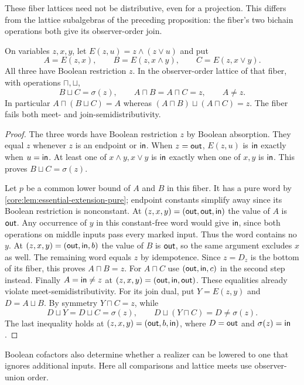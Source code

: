 These fiber lattices need not be distributive, even for a projection.
This differs from the lattice subalgebras of the preceding proposition:
the fiber's two bichain operations both give its observer-order join.

\begin{corollary}
\label{core:cor:boolean-fiber-nondistributive}
On variables $z,x,y$, let $E(z,u)=z\wedge(z\vee u)$ and put
\[
 A=E(z,x),\qquad B=E(z,x\wedge y),\qquad C=E(z,x\vee y).
\]
All three have Boolean restriction $z$. In the observer-order lattice
of that fiber, with operations $\sqcap,\sqcup$,
\[
 B\sqcup C=\sigma(z),\qquad
 A\sqcap B=A\sqcap C=z,\qquad A\ne z.
\]
In particular $A\sqcap(B\sqcup C)=A$ whereas
$(A\sqcap B)\sqcup(A\sqcap C)=z$.
The fiber fails both meet- and join-semidistributivity.
\end{corollary}
\begin{proof}
The three words have Boolean restriction $z$ by Boolean absorption.
They equal $z$ whenever $z$ is an endpoint or $\mathsf{in}$.
When $z=\mathsf{out}$, $E(z,u)$ is $\mathsf{in}$ exactly when $u=\mathsf{in}$.
At least one of $x\wedge y,x\vee y$ is $\mathsf{in}$ exactly when one
of $x,y$ is $\mathsf{in}$. This proves $B\sqcup C=\sigma(z)$.

Let $p$ be a common lower bound of $A$ and $B$ in this fiber.
It has a pure word by \cref{core:lem:essential-extension-pure};
endpoint constants simplify away since its Boolean restriction is
nonconstant. At $(z,x,y)=(\mathsf{out},\mathsf{out},\mathsf{in})$ the value of $A$ is $\mathsf{out}$.
Any occurrence of $y$ in this constant-free word would give $\mathsf{in}$,
since both operations on middle inputs pass every marked input.
Thus the word contains no $y$. At $(z,x,y)=(\mathsf{out},\mathsf{in},b)$ the value
of $B$ is $\mathsf{out}$, so the same argument excludes $x$ as well.
The remaining word equals $z$ by idempotence. Since $z=D_z$ is the
bottom of its fiber, this proves $A\sqcap B=z$.
For $A\sqcap C$ use $(\mathsf{out},\mathsf{in},c)$ in the second step instead.
Finally $A=\mathsf{in}\ne z$ at $(z,x,y)=(\mathsf{out},\mathsf{in},\mathsf{out})$.
These equalities already violate meet-semidistributivity.
For its join dual, put $Y=E(z,y)$ and $D=A\sqcup B$.
By symmetry $Y\sqcap C=z$, while
\[
 D\sqcup Y=D\sqcup C=\sigma(z),\qquad
 D\sqcup(Y\sqcap C)=D\ne\sigma(z).
\]
The last inequality holds at $(z,x,y)=(\mathsf{out},b,\mathsf{in})$, where
$D=\mathsf{out}$ and $\sigma(z)=\mathsf{in}$.
\end{proof}

Boolean cofactors also determine whether a realizer can be lowered to one
that ignores additional inputs. Here all comparisons and lattice meets
use observer-union order.

